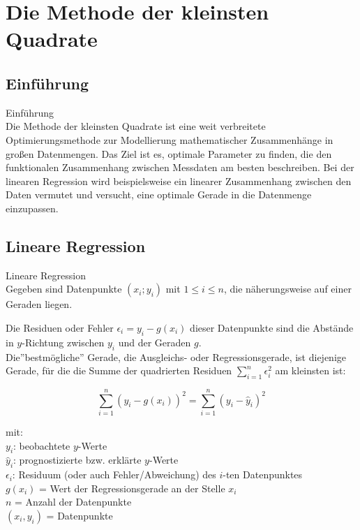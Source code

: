 \section{Die Methode der kleinsten Quadrate}

\subsection{Einführung}
\begin{concept}{Einführung}\\
Die Methode der kleinsten Quadrate ist eine weit verbreitete Optimierungsmethode zur Modellierung mathematischer Zusammenhänge in großen Datenmengen. Das Ziel ist es, optimale Parameter zu finden, die den funktionalen Zusammenhang zwischen Messdaten am besten beschreiben. Bei der linearen Regression wird beispielsweise ein linearer Zusammenhang zwischen den Daten vermutet und versucht, eine optimale Gerade in die Datenmenge einzupassen.
\end{concept}

\subsection{Lineare Regression}

\begin{definition}{Lineare Regression}\\
Gegeben sind Datenpunkte $(x_i; y_i)$ mit $1 \leq i \leq n$, die näherungsweise auf einer Geraden liegen. 

Die Residuen oder Fehler $\epsilon_i = y_i - g(x_i)$ dieser Datenpunkte sind die Abstände in $y$-Richtung zwischen $y_i$ und der Geraden $g$.\\

Die''bestmögliche'' Gerade, die Ausgleichs- oder Regressionsgerade, ist diejenige Gerade, für die die Summe der quadrierten Residuen $\sum_{i=1}^n \epsilon_i^2$ am kleinsten ist:

\[\sum_{i=1}^n (y_i - g(x_i))^2 = \sum_{i=1}^n (y_i - \hat{y}_i)^2\]

mit:\\
$y_i$: beobachtete $y$-Werte\\
$\hat{y}_i$: prognostizierte bzw. erklärte $y$-Werte\\
$\epsilon_i$: Residuum (oder auch Fehler/Abweichung) des $i$-ten Datenpunktes\\
$g(x_i)$ = Wert der Regressionsgerade an der Stelle $x_i$\\
$n$ = Anzahl der Datenpunkte\\
$(x_i, y_i)$ = Datenpunkte
\end{definition}

